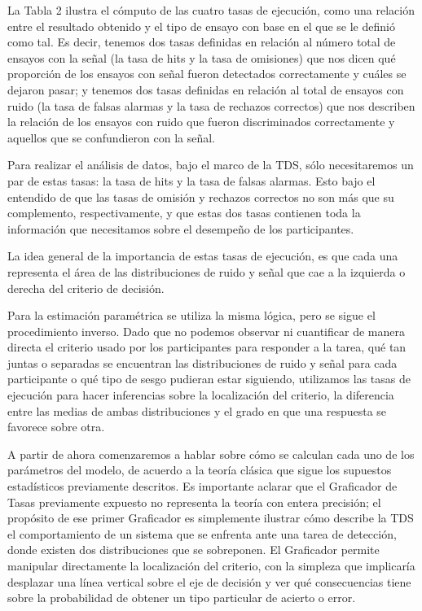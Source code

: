 La Tabla 2 ilustra el cómputo de las cuatro tasas de ejecución, como una relación entre el resultado obtenido y el tipo de ensayo con base en el que se le definió como tal. Es decir, tenemos dos tasas definidas en relación al número total de ensayos con la señal (la tasa de hits y la tasa de omisiones) que nos dicen qué proporción de los ensayos con señal fueron detectados correctamente y cuáles se dejaron pasar; y tenemos dos tasas definidas en relación al total de ensayos con ruido (la tasa de falsas alarmas y la tasa de rechazos correctos) que nos describen la relación de los ensayos con ruido que fueron discriminados correctamente y aquellos que se confundieron con la señal.

Para realizar el análisis de datos, bajo el marco de la TDS, sólo necesitaremos un par de estas tasas: la tasa de hits y la tasa de falsas alarmas. Esto bajo el entendido de que las tasas de omisión y rechazos correctos no son más que su complemento, respectivamente, y que estas dos tasas contienen toda la información que necesitamos sobre el desempeño de los participantes.

La idea general de la importancia de estas tasas de ejecución, es que cada una representa el área de las distribuciones de ruido y señal que cae a la izquierda o derecha del criterio de decisión.

Para la estimación paramétrica se utiliza la misma lógica, pero se sigue el procedimiento inverso. Dado que no podemos observar ni cuantificar de manera directa el criterio usado por los participantes para responder a la tarea, qué tan juntas o separadas se encuentran las distribuciones de ruido y señal para cada participante o qué tipo de sesgo pudieran estar siguiendo, utilizamos las tasas de ejecución para hacer inferencias sobre la localización del criterio, la diferencia entre las medias de ambas distribuciones y el grado en que una respuesta se favorece sobre otra. 

A partir de ahora comenzaremos a hablar sobre cómo se calculan cada uno de los parámetros del modelo, de acuerdo a la teoría clásica que sigue los supuestos estadísticos previamente descritos.  Es importante aclarar que el Graficador de Tasas previamente expuesto no representa la teoría con entera precisión; el propósito de ese primer Graficador es simplemente ilustrar cómo describe la TDS el comportamiento de un sistema que se enfrenta ante una tarea de detección, donde existen dos distribuciones que se sobreponen. El Graficador permite manipular directamente la localización del criterio, con la simpleza que implicaría desplazar una línea vertical sobre el eje de decisión y ver qué consecuencias tiene sobre la probabilidad de obtener un tipo particular de acierto o error.


